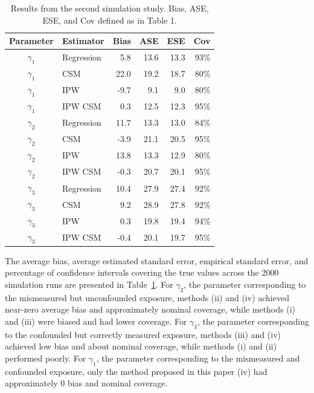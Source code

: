 \documentclass[useAMS,usenatbib,referee]{biom}
\begin{document}
\begin{table}[]
    \caption{Results from the second simulation study. Bias, ASE, ESE, and Cov defined as in Table 1.}
    \begin{center}
    \begin{tabular}{clrrrr}
    \hline
        Parameter & Estimator & Bias & ASE & ESE & Cov \\
         \hline
$\gamma_{1}$ & Regression & 5.8 & 13.6 & 13.3 & 93\% \\
$\gamma_{1}$ & CSM & 22.0 & 19.2 & 18.7 & 80\% \\
$\gamma_{1}$ & IPW & -9.7 & 9.1 & 9.0 & 80\% \\
$\gamma_{1}$ & IPW CSM & 0.3 & 12.5 & 12.3 & 95\% \\[4pt]
$\gamma_{2}$ & Regression & 11.7 & 13.3 & 13.0 & 84\% \\
$\gamma_{2}$ & CSM & -3.9 & 21.1 & 20.5 & 95\% \\
$\gamma_{2}$ & IPW & 13.8 & 13.3 & 12.9 & 80\% \\
$\gamma_{2}$ & IPW CSM & -0.3 & 20.7 & 20.1 & 95\% \\[4pt]
$\gamma_{3}$ & Regression & 10.4 & 27.9 & 27.4 & 92\% \\
$\gamma_{3}$ & CSM & 9.2 & 28.9 & 27.8 & 92\% \\
$\gamma_{3}$ & IPW & 0.3 & 19.8 & 19.4 & 94\% \\
$\gamma_{3}$ & IPW CSM & -0.4 & 20.1 & 19.7 & 95\% \\
         \hline
    \end{tabular}
    \end{center}
    \label{tab:two}
\end{table}

The average bias, average estimated standard error, empirical standard error, and percentage of confidence intervals covering the true values across the 2000 simulation runs are presented in Table~\ref{tab:two}. For $\gamma_{2}$, the parameter corresponding to the mismeasured but unconfounded exposure, methods (ii) and (iv) achieved near-zero average bias and approximately nominal coverage, while methods (i) and (iii) were biased and had lower coverage. For $\gamma_{3}$, the parameter corresponding to the confounded but correctly measured exposure, methods (iii) and (iv) achieved low bias and about nominal coverage, while methods (i) and (ii) performed poorly. For $\gamma_{1}$, the parameter corresponding to the mismeasured and confounded exposure, only the method proposed in this paper (iv) had approximately 0 bias and nominal coverage.
\end{document}
